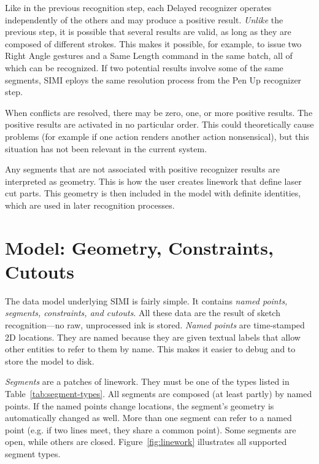 Like in the previous recognition step, each Delayed recognizer
operates independently of the others and may produce a positive
result. \textit{Unlike} the previous step, it is possible that several
results are valid, as long as they are composed of different
strokes. This makes it possible, for example, to issue two Right Angle
gestures and a Same Length command in the same batch, all of which can
be recognized. If two potential results involve some of the same
segments, SIMI eploys the same resolution process from the Pen Up
recognizer step.

When conflicts are resolved, there may be zero, one, or more positive
results. The positive results are activated in no particular
order. This could theoretically cause problems (for example if one
action renders another action nonsensical), but this situation has not
been relevant in the current system.

Any segments that are not associated with positive recognizer results
are interpreted as geometry. This is how the user creates linework
that define laser cut parts. This geometry is then included in the
model with definite identities, which are used in later recognition
processes.

\section{Model: Geometry, Constraints, Cutouts}

The data model underlying SIMI is fairly simple. It contains
\textit{named points, segments, constraints, and cutouts}. All these
data are the result of sketch recognition---no raw, unprocessed ink is
stored. \textit{Named points} are time-stamped 2D locations. They are
named because they are given textual labels that allow other entities
to refer to them by name. This makes it easier to debug and to store
the model to disk. 

\textit{Segments} are a patches of linework. They must be one of the
types listed in Table~\ref{tab:segment-types}. All segments are
composed (at least partly) by named points. If the named points change
locations, the segment's geometry is automatically changed as
well. More than one segment can refer to a named point (e.g. if two
lines meet, they share a common point). Some segments are open, while
others are closed. Figure~\ref{fig:linework} illustrates all supported
segment types.


